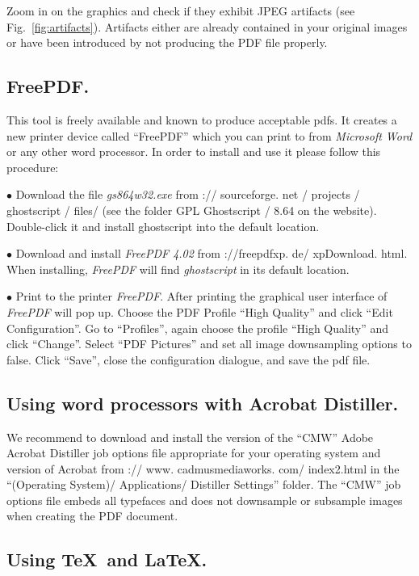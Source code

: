 \documentclass[twoside]{article}
\begin{document}
Zoom in on the graphics and check if they exhibit JPEG artifacts (see 
Fig.\ \ref{fig:artifacts}). Artifacts either are already contained in your 
original images or have been introduced by not producing the PDF file 
properly.


\subsection{FreePDF.}


This tool is freely available and known to produce acceptable pdfs. It
creates a new printer device called  ``FreePDF'' which you can print to from
{\it Microsoft Word} or any other word processor. In order to install and use it
please follow this procedure:

$\bullet$  Download the file {\it gs864w32.exe} from
{\http:// sourceforge. net / projects / ghostscript / files/}
(see the folder GPL Ghostscript / 8.64 on the website). Double-click
it and install ghostscript into the default location.

$\bullet$ Download and install {\it FreePDF 4.02} from
{\http://freepdfxp. de/ xpDownload. html}.
 When installing, {\it FreePDF} will find {\it ghostscript} in its
default location.

$\bullet$ Print to the printer {\it FreePDF}. After printing the graphical user
interface of {\it FreePDF} will pop up. Choose the PDF Profile
``High Quality'' and click ``Edit Configuration''. Go to ``Profiles'',
again choose the profile ``High Quality'' and click ``Change''.
Select ``PDF Pictures'' and set all image downsampling options to false.
Click ``Save'', close the configuration dialogue, and save the pdf file.

\subsection{Using word processors with Acrobat Distiller.}

We recommend to download and install the version of the ``CMW'' Adobe 
Acrobat Distiller job options file appropriate for your operating system 
and version of Acrobat from {\http:// www. cadmusmediaworks. com/ 
index2.html} in the ``(Operating System)/\hskip 0pt Applications/\hskip 
0pt Distiller Settings'' folder. The ``CMW'' job options file embeds all 
typefaces and does not downsample or subsample images when creating the 
PDF document.



\subsection{Using \TeX\ and \LaTeX.}
\end{document}
